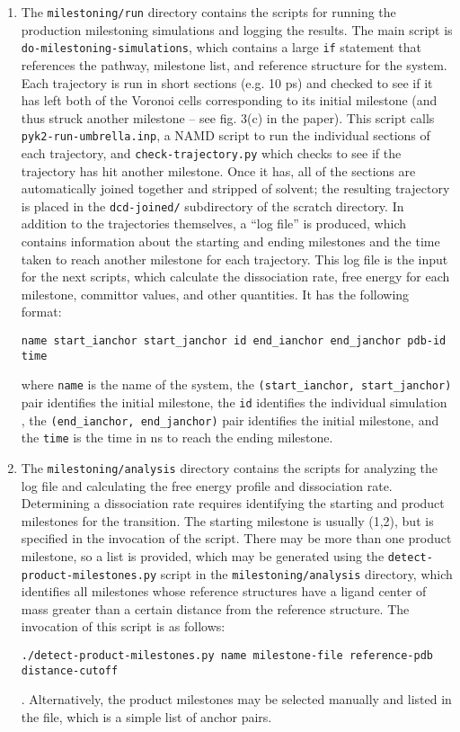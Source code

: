\documentclass{article}      %
\begin{document}
\begin{enumerate}
\item The \verb+milestoning/run+ directory contains the scripts for running the production milestoning simulations and logging the results.  The main script is \verb+do-milestoning-simulations+, which contains a large \verb+if+ statement that references the pathway, milestone list, and reference structure for the system.  Each trajectory is run in short sections (e.g. 10 ps) and checked to see if it has left both of the Voronoi cells corresponding to its initial milestone (and thus struck another milestone -- see fig. 3(c) in the paper).  This script calls \verb+pyk2-run-umbrella.inp+, a NAMD script to run the individual sections of each trajectory, and \verb+check-trajectory.py+ which checks to see if the trajectory has hit another milestone.  Once it has, all of the sections are automatically joined together and stripped of solvent; the resulting trajectory is placed in the \verb+dcd-joined/+ subdirectory of the scratch directory.  In addition to the trajectories themselves, a ``log file'' is produced, which contains information about the starting and ending milestones and the time taken to reach another milestone for each trajectory.  This log file is the input for the next scripts, which calculate the dissociation rate, free energy for each milestone, committor values, and other quantities.  It has the following format:
\begin{verbatim}
name start_ianchor start_janchor id end_ianchor end_janchor pdb-id time
\end{verbatim}
where \verb+name+ is the name of the system, the \verb+(start_ianchor, start_janchor)+ pair identifies the initial milestone, the \verb+id+ identifies the individual simulation , the  \verb+(end_ianchor, end_janchor)+ pair identifies the initial milestone, and the \verb+time+ is the time in ns to reach the ending milestone.

\item The \verb+milestoning/analysis+  directory contains the scripts for analyzing the log file and calculating the free energy profile and dissociation rate. Determining a dissociation rate requires identifying the starting and product milestones for the transition.  The starting milestone is usually (1,2), but is specified in the invocation of the script.  There may be more than one product milestone, so a list is provided, which may be generated using the \verb+detect-product-milestones.py+ script in the \verb+milestoning/analysis+  directory, which identifies all milestones whose reference structures have a ligand center of mass greater than a certain distance from the reference structure.  The invocation of this script is as follows:
\begin{verbatim}
./detect-product-milestones.py name milestone-file reference-pdb distance-cutoff
\end{verbatim}.  
Alternatively, the product milestones may be selected manually and listed in the file, which is a simple list of anchor pairs.


\end{enumerate}
\end{document}
